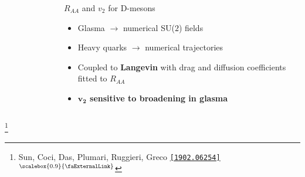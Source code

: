 \documentclass[aspectratio=169,11pt,usenames,dvipsnames]{beamer}
\renewcommand{\thefootnote}{\color{customblue}\faPaperPlaneO}
\newcommand\blfootnote[1]{%
  \begingroup
  \renewcommand\thefootnote{}\footnote{#1}%
  \addtocounter{footnote}{-1}%
  \endgroup
}
\begin{document}
\begin{frame}[t]
\begin{columns}[onlytextwidth,t]
\begin{figure}
        \end{figure}
        \begin{center}
            {\Large\color{isgold} $R_{AA}$ and $v_2$ for D-mesons \\[10pt]}
            \footnotesize
                \begin{itemize}
                    \item {\color{lightgray}Glasma $\rightarrow$ numerical SU($2$) fields}
                    \item {\color{lightgray}Heavy quarks $\rightarrow$ numerical trajectories}
                    \item {\color{lightgray}Coupled to {\bfseries Langevin} with drag and diffusion coefficients fitted to $R_{AA}$}\\[15pt]
                    \item {\color{destacado}\bfseries\normalsize{$\boldsymbol{v_2}$ sensitive to broadening in glasma}}
                \end{itemize}
        \end{center}
    \end{columns}
    \blfootnote{\scriptsize Sun, Coci, Das, Plumari, Ruggieri, Greco \href{https://arxiv.org/abs/1902.06254}{\color{palgold}\texttt{[1902.06254]}$^\text{\scalebox{0.9}{\faExternalLink}}$}}
\end{frame}

\end{document}
